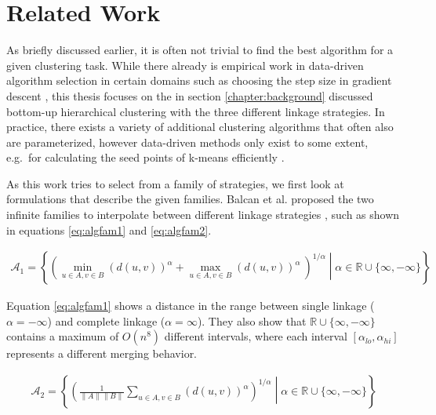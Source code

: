 \chapter{Related Work}

As briefly discussed earlier, it is often not trivial to find the best algorithm for a given clustering task. While there already is empirical work in data-driven algorithm selection in certain domains such as choosing the step size in gradient descent \cite{DBLP:journals/corr/GuptaR15b}, this thesis focuses on the in section \ref{chapter:background} discussed bottom-up hierarchical clustering with the three different linkage strategies. In practice, there exists a variety of additional clustering algorithms that often also are parameterized, however data-driven methods only exist to some extent, e.g.\ for calculating the seed points of k-means efficiently \cite{arthur2007k}.


As this work tries to select from a family of strategies, we first look at formulations that describe the given families. Balcan et al. proposed the two infinite families to interpolate between different linkage strategies \cite{DBLP:journals/corr/BalcanNVW16}, such as shown in equations \ref{eq:algfam1} and \ref{eq:algfam2}.

\begin{equation}
    \begin{aligned}
        \mathcal{A}_1 = \left\{ \left( \min\limits_{u \in A, v \in B} (d(u,v))^\alpha +  \max\limits_{u \in A, v \in B} (d(u,v))^\alpha\ \right)^{1 / \alpha} \middle| \alpha \in \mathbb{R} \cup \{\infty, -\infty\} \right\}
    \end{aligned}
    \label{eq:algfam1}
\end{equation}

Equation \ref{eq:algfam1} shows a distance in the range between single linkage ($\alpha = -\infty$) and complete linkage ($\alpha = \infty$). They also show that $\mathbb{R} \cup \{\infty, -\infty\}$ contains a maximum of $O(n^8)$ different intervals, where each interval $[\alpha_{lo}, \alpha_{hi}]$ represents a different merging behavior.

\begin{equation}
    \begin{aligned}
        \mathcal{A}_2 = \left\{ \left( \frac{1}{\|A\| \|B\|} \sum\limits_{u \in A, v \in B} (d(u,v))^\alpha \right)^{1 / \alpha} \middle| \alpha \in \mathbb{R} \cup \{\infty, -\infty\} \right\}
    \end{aligned}
    \label{eq:algfam2}
\end{equation}

